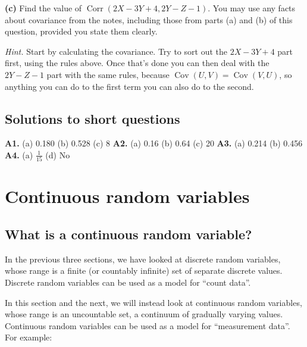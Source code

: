 \documentclass[
  a4paper,
]{book}
\theoremstyle{definition}
\theoremstyle{definition}
\theoremstyle{definition}
\theoremstyle{definition}
\theoremstyle{remark}
\begin{document}
\textbf{(c)} Find the value of \(\operatorname{Corr}(2X - 3Y + 4, 2Y - Z - 1)\). You may use any facts about covariance from the notes, including those from parts (a) and (b) of this question, provided you state them clearly.

\begin{myanswers}
\emph{Hint.} Start by calculating the covariance. Try to sort out the \(2X - 3Y + 4\) part first, using the rules above. Once that's done you can then deal with the \(2Y - Z -1\) part with the same rules, because \(\operatorname{Cov}(U, V) = \operatorname{Cov}(V,U)\), so anything you can do to the first term you can also do to the second.

\end{myanswers}

\hypertarget{P4-short-sols}{%
\section*{Solutions to short questions}\label{P4-short-sols}}

\textbf{A1.} (a) 0.180 (b) 0.528 (c) 8 \textbf{A2.} (a) 0.16 (b) 0.64 (c) 20 \textbf{A3.} (a) 0.214 (b) 0.456 \textbf{A4.} (a) \(\frac{1}{15}\) (d) No

\hypertarget{S08-continuous}{%
\chapter{Continuous random variables}\label{S08-continuous}}

\hypertarget{continuous-rv}{%
\section{What is a continuous random variable?}\label{continuous-rv}}

In the previous three sections, we have looked at discrete random variables, whose range is a finite (or countably infinite) set of separate discrete values. Discrete random variables can be used as a model for ``count data''.

In this section and the next, we will instead look at continuous random variables, whose range is an uncountable set, a continuum of gradually varying values. Continuous random variables can be used as a model for ``measurement data''. For example:
\end{document}
